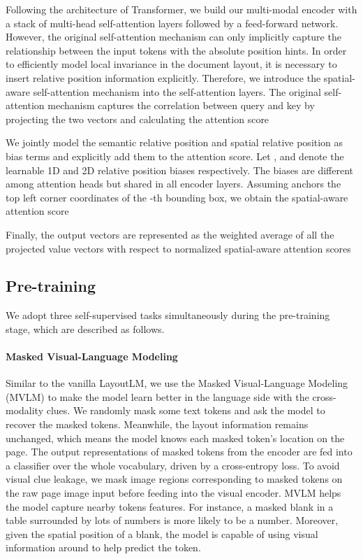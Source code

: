 \documentclass{article} \usepackage{iclr2021_conference,times}
\begin{document}
Following the architecture of Transformer, we build our multi-modal encoder with a stack of multi-head self-attention layers followed by a feed-forward network. However, the original self-attention mechanism can only implicitly capture the relationship between the input tokens with the absolute position hints. In order to efficiently model local invariance in the document layout, it is necessary to insert relative position information explicitly. Therefore, we introduce the spatial-aware self-attention mechanism into the self-attention layers. The original self-attention mechanism captures the correlation between query  and key  by projecting the two vectors and calculating the attention score

We jointly model the semantic relative position and spatial relative position as bias terms and explicitly add them to the attention score. Let  ,  and  denote the learnable 1D and 2D relative position biases respectively. The biases are different among attention heads but shared in all encoder layers. Assuming  anchors the top left corner coordinates of the -th bounding box, we obtain the spatial-aware attention score

Finally, the output vectors are represented as the weighted average of all the projected value vectors with respect to normalized spatial-aware attention scores










\subsection{Pre-training}

We adopt three self-supervised tasks simultaneously during the pre-training stage, which are described as follows.

\paragraph{Masked Visual-Language Modeling}

Similar to the vanilla LayoutLM, we use the Masked Visual-Language Modeling (MVLM) to make the model learn better in the language side with the cross-modality clues. We randomly mask some text tokens and ask the model to recover the masked tokens. Meanwhile, the layout information remains unchanged, which means the model knows each masked token's location on the page. The output representations of masked tokens from the encoder are fed into a classifier over the whole vocabulary, driven by a cross-entropy loss.
To avoid visual clue leakage, we mask image regions corresponding to masked tokens on the raw page image input before feeding into the visual encoder.
MVLM helps the model capture nearby tokens features. For instance, a masked blank in a table surrounded by lots of numbers is more likely to be a number. Moreover, given the spatial position of a blank, the model is capable of using visual information around to help predict the token.
\end{document}
